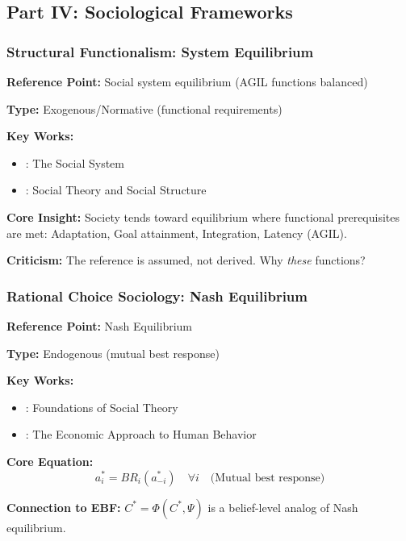 
\subsection{Part IV: Sociological Frameworks}
\label{sec:AY-sociology}

\subsubsection{Structural Functionalism: System Equilibrium}

\begin{tcolorbox}[colback=gray!5!white, colframe=gray!75!black]
\textbf{Reference Point:} Social system equilibrium (AGIL functions balanced)

\textbf{Type:} Exogenous/Normative (functional requirements)

\textbf{Key Works:}
\begin{itemize}[nosep]
    \item \citet{parsons1951}: The Social System
    \item \citet{merton1968social}: Social Theory and Social Structure
\end{itemize}

\textbf{Core Insight:}
Society tends toward equilibrium where functional prerequisites are met:
Adaptation, Goal attainment, Integration, Latency (AGIL).

\textbf{Criticism:}
The reference is assumed, not derived. Why \emph{these} functions?
\end{tcolorbox}

\subsubsection{Rational Choice Sociology: Nash Equilibrium}

\begin{tcolorbox}[colback=gray!5!white, colframe=gray!75!black]
\textbf{Reference Point:} Nash Equilibrium

\textbf{Type:} Endogenous (mutual best response)

\textbf{Key Works:}
\begin{itemize}[nosep]
    \item \citet{coleman1990}: Foundations of Social Theory
    \item \citet{becker1976economic}: The Economic Approach to Human Behavior
\end{itemize}

\textbf{Core Equation:}
\begin{equation}
a_i^* = BR_i(a_{-i}^*) \quad \forall i \quad \text{(Mutual best response)}
\end{equation}

\textbf{Connection to EBF:}
$C^* = \Phi(C^*, \Psi)$ is a belief-level analog of Nash equilibrium.
\end{tcolorbox}

